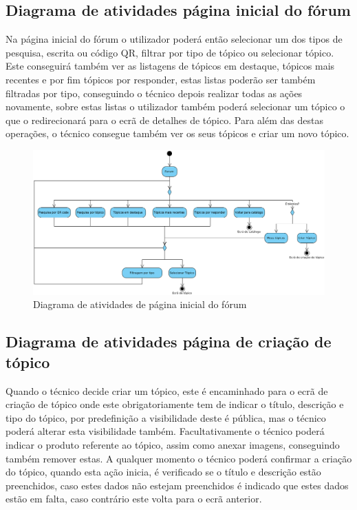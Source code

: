 \newpage

\subsection{Diagrama de atividades página inicial do fórum}

Na página inicial do fórum o utilizador poderá então selecionar um dos tipos de pesquisa, escrita 
ou código QR, filtrar por tipo de tópico ou selecionar tópico. Este conseguirá também ver as 
listagens de tópicos em destaque, tópicos mais recentes e por fim tópicos por 
responder, estas listas poderão ser também filtradas por tipo, conseguindo o 
técnico depois realizar todas as ações novamente, sobre estas listas o utilizador também poderá 
selecionar um tópico o que o redirecionará para o ecrã de detalhes de tópico. Para além das 
destas operações, o técnico consegue também ver os seus tópicos e criar um novo tópico.

\begin{figure}[htb]
    \centering
    \includegraphics[width=\textwidth]{images/diagramas/atividades/diagrama_atividades_forum.png}
    \caption{Diagrama de atividades de página inicial do fórum}
    \label{fig:36}
\end{figure}



\newpage

\subsection{Diagrama de atividades página de criação de tópico}

Quando o técnico decide criar um tópico, este é encaminhado para o ecrã de criação de tópico 
onde este obrigatoriamente tem de indicar o título, descrição e tipo do tópico, por predefinição a 
visibilidade deste é pública, mas o técnico poderá alterar esta visibilidade também. 
Facultativamente o técnico poderá indicar o produto referente ao tópico, 
assim como anexar imagens, conseguindo também remover estas. A qualquer momento o técnico poderá 
confirmar a criação do tópico, quando esta ação inicia, é verificado se o título e descrição estão 
preenchidos, caso estes dados não estejam preenchidos é indicado que estes dados estão em falta, 
caso contrário este volta para o ecrã anterior.

